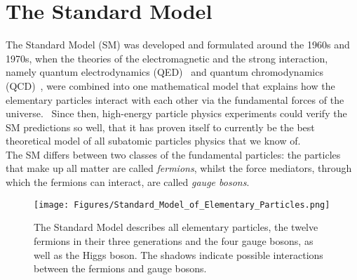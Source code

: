 \section{The Standard Model}
\label{StandardModel}
The Standard Model (SM) was developed and formulated around the 1960s and 1970s, when the theories of the electromagnetic and the strong interaction, namely quantum electrodynamics (QED)~\cite{QED,QED2,QED3} and quantum chromodynamics (QCD)~\cite{QCD,QCD2}, were combined into one mathematical model that explains how the elementary particles interact with each other via the fundamental forces of the universe.~\cite[p. 3]{Griffiths}
Since then, high-energy particle physics experiments could verify the SM predictions so well, that it has proven itself to currently be the best theoretical model of all subatomic particles physics that we know of.\\
The SM differs between two classes of the fundamental particles: 
the particles that make up all matter are called \textit{fermions}, whilst the force mediators, through which the fermions can interact, are called \textit{gauge bosons}.
\begin{figure}[h]
\centering
\texttt{[image: Figures/Standard\_Model\_of\_Elementary\_Particles.png]}
\caption[Standard Model]{The Standard Model describes all elementary particles, the twelve fermions in their three generations and the four gauge bosons, as well as the Higgs boson.
The shadows indicate possible interactions between the fermions and gauge bosons.~\cite{SM}}
\label{fig:SM}
\end{figure}

